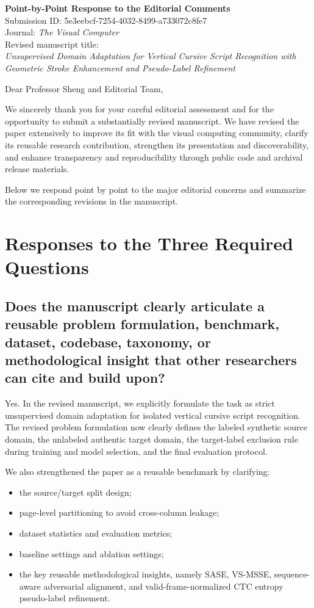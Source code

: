 \documentclass[11pt]{article}
\begin{document}
\begin{center}
{\LARGE \textbf{Point-by-Point Response to the Editorial Comments}}\\[0.8em]
{\large Submission ID: 5e3eebcf-7254-4032-8499-a733072c8fe7}\\[0.4em]
{\large Journal: \textit{The Visual Computer}}\\[0.4em]
{\large Revised manuscript title:}\\[0.2em]
\textit{Unsupervised Domain Adaptation for Vertical Cursive Script Recognition with Geometric Stroke Enhancement and Pseudo-Label Refinement}
\end{center}

\vspace{0.8em}

Dear Professor Sheng and Editorial Team,

We sincerely thank you for your careful editorial assessment and for the opportunity to submit a substantially revised manuscript. We have revised the paper extensively to improve its fit with the visual computing community, clarify its reusable research contribution, strengthen its presentation and discoverability, and enhance transparency and reproducibility through public code and archival release materials.

Below we respond point by point to the major editorial concerns and summarize the corresponding revisions in the manuscript.

\section{Responses to the Three Required Questions}

\subsection{Does the manuscript clearly articulate a reusable problem formulation, benchmark, dataset, codebase, taxonomy, or methodological insight that other researchers can cite and build upon?}

Yes. In the revised manuscript, we explicitly formulate the task as strict unsupervised domain adaptation for isolated vertical cursive script recognition. The revised problem formulation now clearly defines the labeled synthetic source domain, the unlabeled authentic target domain, the target-label exclusion rule during training and model selection, and the final evaluation protocol.

We also strengthened the paper as a reusable benchmark by clarifying:
\begin{itemize}[leftmargin=1.5em]
\item the source/target split design;
\item page-level partitioning to avoid cross-column leakage;
\item dataset statistics and evaluation metrics;
\item baseline settings and ablation settings;
\item the key reusable methodological insights, namely SASE, VS-MSSE, sequence-aware adversarial alignment, and valid-frame-normalized CTC entropy pseudo-label refinement.
\end{itemize}
\end{document}
